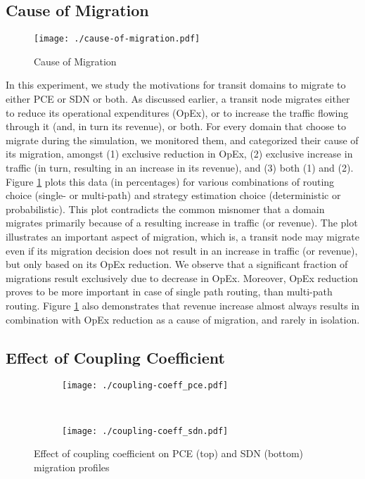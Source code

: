 \documentclass[smallextended]{svjour3}
\begin{document}
\subsection{Cause of Migration}

\begin{figure}
\begin{center}
\texttt{[image: ./cause-of-migration.pdf]}
\caption{Cause of Migration}
\label{fig:cause of migration}
\end{center}
\end{figure}

In this experiment, we study the motivations for transit domains to migrate to
either PCE or SDN or both. As discussed earlier, a transit node migrates either
to reduce its operational expenditures (OpEx), or to increase the traffic
flowing through it (and, in turn its revenue), or both. For every domain that
choose to migrate during the simulation, we monitored them, and categorized
their cause of its migration, amongst (1) exclusive reduction in OpEx, (2)
exclusive increase in traffic (in turn, resulting in an increase in its
revenue), and (3) both (1) and (2). Figure \ref{fig:cause of migration} plots
this data (in percentages) for various combinations of routing choice (single-
or multi-path) and strategy estimation choice (deterministic or probabilistic).
This plot contradicts the common misnomer that a domain migrates
primarily because of a resulting increase in traffic (or revenue). The plot
illustrates an important aspect of migration, which is, a transit node may migrate even if its migration
decision does not result in an increase in traffic (or revenue), but only based
on its OpEx reduction. We observe that a significant fraction of migrations
result exclusively due to decrease in OpEx. Moreover, OpEx reduction proves to
be more important in case of single path routing, than multi-path
routing. Figure \ref{fig:cause of migration} also demonstrates that revenue
increase almost always results in combination with OpEx reduction as a cause of
migration, and rarely in isolation.

\subsection{Effect of Coupling Coefficient}

\begin{figure}
\centering
\begin{subfigure}
\centering
\texttt{[image: ./coupling-coeff\_pce.pdf]}
\end{subfigure}~ \begin{subfigure}
\centering
\texttt{[image: ./coupling-coeff\_sdn.pdf]}
\end{subfigure}
\caption{Effect of coupling coefficient on PCE (top) and SDN (bottom)
migration profiles}
\label{fig:effect of coupling coeff}
\end{figure}
\end{document}

